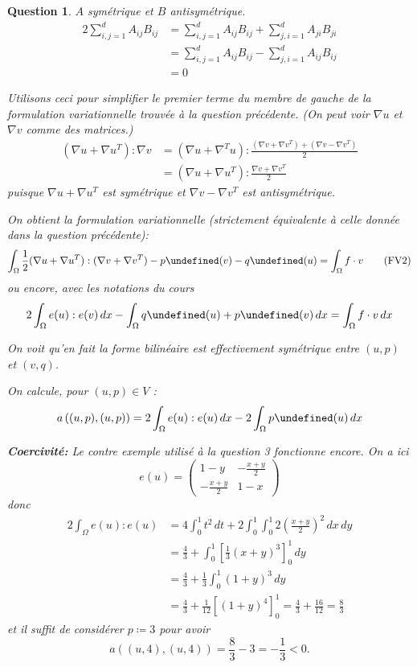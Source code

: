 \documentclass{article}
\theoremstyle{plain}
\newtheorem{ques}{Question}
\let\div\undefined
\DeclareMathOperator{\div}{div}
\begin{document}
\begin{ques}
$A$ symétrique et $B$ antisymétrique.
\begin{align*}
    2 \sum_{i, j=1}^d A_{ij} B_{ij}
    &= \sum_{i, j=1}^d A_{ij} B_{ij} + \sum_{j, i=1}^d A_{ji} B_{ji} \\
    &= \sum_{i, j=1}^d A_{ij} B_{ij} - \sum_{j, i=1}^d A_{ij} B_{ij} \\
    &= 0
\end{align*}

Utilisons ceci pour simplifier le premier terme du membre de gauche de la formulation variationnelle trouvée à la question précédente.
(On peut voir $\nabla u$ et $\nabla v$ comme des matrices.)
\begin{align*}
    (\nabla u + \nabla u^T) : \nabla v &= (\nabla u + \nabla^T u) : \frac{(\nabla v + \nabla v^T) + (\nabla v - \nabla v^T)}{2} \\
    &= (\nabla u + \nabla u^T) : \frac{\nabla v + \nabla v^T}{2}
\end{align*}
puisque $\nabla u + \nabla u^T$ est symétrique et $\nabla v - \nabla v^T$ est antisymétrique.

On obtient la formulation variationnelle (strictement équivalente à celle donnée dans la question précédente):
\begin{equation*}
	\int_\Omega \frac{1}{2} (\nabla u + \nabla u^T) : (\nabla v + \nabla v^T) 
	- p \div(v)
	- q \div(u)
    = \int_\Omega f \cdot v
    \tag{FV2}
\end{equation*}
ou encore, avec les notations du cours
\begin{equation}\label{formVar2}
    2\int_\Omega e(u):e(v)\,dx - \int_\Omega q\div(u) + p\div(v)\,dx = \int_\Omega f\cdot v\,dx
\end{equation}


On voit qu'en fait la forme bilinéaire est effectivement symétrique entre $(u, p)$ et $(v, q)$.

On calcule, pour $(u,p)\in V$ :
\[
    a\left((u,p),(u,p)\right) =
    2\int_\Omega e(u):e(u)\,dx - 2\int_\Omega p\div(u)\,dx
\]

\textbf{Coercivité:} Le contre exemple utilisé à la question 3 fonctionne encore. On a ici
\[
    e(u) = \begin{pmatrix}
        1-y & -\frac{x+y}{2} \\ - \frac{x+y}{2} & 1-x
    \end{pmatrix}
\]
donc
\begin{align*}
    2\int_\Omega e(u): e(u) &= 4\int_0^1 t^2\,dt + 2\int_0^1\int_0^1 2\left(\frac{x+y}{2}\right)^2\,dx\,dy \\
    &= \frac 43 + \int_0^1\left[\frac 13(x+y)^3 \right]_0^1\,dy \\
    &= \frac 43 + \frac 13\int_0^1(1+y)^3 \,dy \\ 
    &= \frac 43 + \frac 1{12}\left[(1+y)^4 \right]_0^1 = \frac 43 + \frac{16}{12} = \frac 83 
\end{align*}
et il suffit de considérer $p \coloneqq 3$ pour avoir
\[
    a((u,4),(u,4)) = \frac 83 - 3 = - \frac 13 < 0.
\]

\end{ques}
\end{document}
